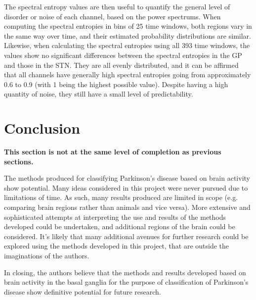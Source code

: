 \documentclass{kththesis}
\begin{document}
The spectral entropy values are then useful to quantify the general level of disorder or noise of each channel, based on the power spectrums. When computing the spectral entropies in bins of 25 time windows, both regions vary in the same way over time, and their estimated probability distributions are similar. Likewise, when calculating the spectral entropies using all 393 time windows, the values show no significant differences between the spectral entropies in the GP and those in the STN. They are all evenly distributed, and it can be affirmed that all channels have generally high spectral entropies going from approximately 0.6 to 0.9 (with 1 being the highest possible value). Despite having a high quantity of noise, they still have a small level of predictability. 


\newpage
\chapter{Conclusion}

\textbf{This section is not at the same level of completion as previous sections.}

The methods produced for classifying Parkinson's disease based on brain activity show potential.
Many ideas considered in this project were never pursued due to limitations of time. 
As such, many results produced are limited in scope (e.g. comparing brain regions rather than animals and vice versa).
More extensive and sophisticated attempts at interpreting the use and results of the methods developed could be undertaken, and additional regions of the brain could be considered.
It's likely that many additional avenues for further research could be explored using the methods developed in this project, that are outside the imaginations of the authors.

In closing, the authors believe that the methods and results developed based on brain activity in the basal ganglia for the purpose of classification of Parkinson's disease show definitive potential for future research.

\newpage
\printbibliography[heading=bibintoc]
\end{document}
